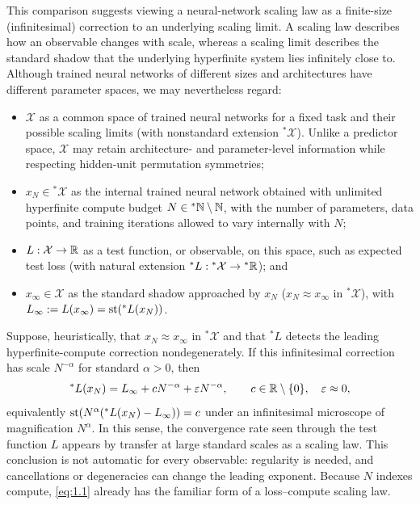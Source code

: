 This comparison suggests viewing a neural-network scaling law as a finite-size (infinitesimal) correction to an underlying scaling limit. A scaling law describes how an observable changes with scale, whereas a scaling limit describes the standard shadow that the underlying hyperfinite system lies infinitely close to. Although trained neural networks of different sizes and architectures have different parameter spaces, we may nevertheless regard:
\begin{itemize}
\item $\mathcal{X}$ as a common space of trained neural networks for a fixed task and their possible scaling limits (with nonstandard extension ${}^*\mathcal{X}$). Unlike a predictor space, $\mathcal{X}$ may retain architecture- and parameter-level information while respecting hidden-unit permutation symmetries;
\item $x_N \in {}^*\mathcal{X}$ as the internal trained neural network obtained with unlimited hyperfinite compute budget $N \in {}^*\mathbb{N} \setminus \mathbb{N}$, with the number of parameters, data points, and training iterations allowed to vary internally with $N$;
\item $L : \mathcal{X} \to \mathbb{R}$ as a test function, or observable, on this space, such as expected test loss (with natural extension ${}^*L : {}^*\mathcal{X} \to {}^*\mathbb{R}$); and
\item $x_\infty \in \mathcal{X}$ as the standard shadow approached by $x_N$ ($x_N \approx x_\infty$ in ${}^*\mathcal{X}$), with $L_\infty := L(x_\infty) = \operatorname{st}({}^*L(x_N))$.
\end{itemize}
Suppose, heuristically, that $x_N \approx x_\infty$ in ${}^*\mathcal{X}$ and that ${}^*L$ detects the leading hyperfinite-compute correction nondegenerately. If this infinitesimal correction has scale $N^{-\alpha}$ for standard $\alpha > 0$, then
\begin{equation}\label{eq:1.1}
{}^*L(x_N) = L_\infty + c N^{-\alpha} + \varepsilon N^{-\alpha}, \qquad c \in \mathbb{R} \setminus \{0\}, \quad \varepsilon \approx 0,
\end{equation}
equivalently $\operatorname{st}\!\left(N^\alpha({}^*L(x_N) - L_\infty)\right) = c$ under an infinitesimal microscope of magnification $N^\alpha$. In this sense, the convergence rate seen through the test function $L$ appears by transfer at large standard scales as a scaling law. This conclusion is not automatic for every observable: regularity is needed, and cancellations or degeneracies can change the leading exponent. Because $N$ indexes compute, \eqref{eq:1.1} already has the familiar form of a loss--compute scaling law.

